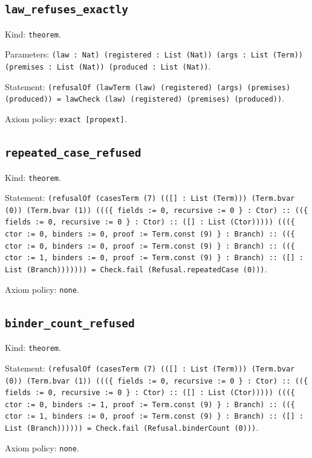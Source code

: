 \documentclass[11pt]{article}
\begin{document}
\subsection*{\texttt{law\_refuses\_exactly}}
\noindent Kind: \texttt{theorem}.\par
\noindent Parameters: \texttt{(law : Nat) (registered : List (Nat)) (args : List (Term)) (premises : List (Nat)) (produced : List (Nat))}.\par
\noindent Statement: \texttt{(refusalOf (lawTerm (law) (registered) (args) (premises) (produced)) = lawCheck (law) (registered) (premises) (produced))}.\par
\noindent Axiom policy: \texttt{exact [propext]}.\par
\subsection*{\texttt{repeated\_case\_refused}}
\noindent Kind: \texttt{theorem}.\par
\noindent Statement: \texttt{(refusalOf (casesTerm (7) (([] : List (Term))) (Term.bvar (0)) (Term.bvar (1)) (((\{ fields := 0, recursive := 0 \} : Ctor) :: ((\{ fields := 0, recursive := 0 \} : Ctor) :: ([] : List (Ctor))))) (((\{ ctor := 0, binders := 0, proof := Term.const (9) \} : Branch) :: ((\{ ctor := 0, binders := 0, proof := Term.const (9) \} : Branch) :: ((\{ ctor := 1, binders := 0, proof := Term.const (9) \} : Branch) :: ([] : List (Branch))))))) = Check.fail (Refusal.repeatedCase (0)))}.\par
\noindent Axiom policy: \texttt{none}.\par
\subsection*{\texttt{binder\_count\_refused}}
\noindent Kind: \texttt{theorem}.\par
\noindent Statement: \texttt{(refusalOf (casesTerm (7) (([] : List (Term))) (Term.bvar (0)) (Term.bvar (1)) (((\{ fields := 0, recursive := 0 \} : Ctor) :: ((\{ fields := 0, recursive := 0 \} : Ctor) :: ([] : List (Ctor))))) (((\{ ctor := 0, binders := 1, proof := Term.const (9) \} : Branch) :: ((\{ ctor := 1, binders := 0, proof := Term.const (9) \} : Branch) :: ([] : List (Branch)))))) = Check.fail (Refusal.binderCount (0)))}.\par
\noindent Axiom policy: \texttt{none}.\par
\end{document}
